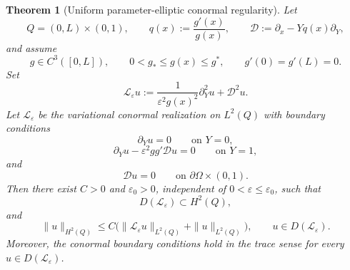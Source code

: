 \documentclass[11pt]{article}
\newtheorem{theorem}{Theorem}[section]
\theoremstyle{definition}
\theoremstyle{remark}
\numberwithin{equation}{section}
\begin{document}
\begin{theorem}[Uniform parameter-elliptic conormal regularity]
\label{thm:uniform-local-conormal-regularity}
Let
\[
Q=(0,L)\times(0,1),\qquad
q(x):=\frac{g'(x)}{g(x)},\qquad
\mathcal D:=\partial_x-Yq(x)\partial_Y,
\]
and assume
\[
g\in C^3([0,L]),\qquad
0<g_*\le g(x)\le g^*,
\qquad
g'(0)=g'(L)=0.
\]
Set
\[
\mathscr L_\varepsilon u
:=
\frac1{\varepsilon^2g(x)^2}\partial_Y^2u+\mathcal D^2u .
\]
Let \(\mathscr L_\varepsilon\) be the variational conormal realization on
\(L^2(Q)\) with boundary conditions
\[
\partial_Yu=0
\qquad\text{on }Y=0,
\]
\[
\partial_Yu-\varepsilon^2gg'\mathcal D u=0
\qquad\text{on }Y=1,
\]
and
\[
\mathcal D u=0
\qquad\text{on }\partial\Omega\times(0,1).
\]
Then there exist \(C>0\) and \(\varepsilon_0>0\), independent of
\(0<\varepsilon\le\varepsilon_0\), such that
\[
D(\mathscr L_\varepsilon)\subset H^2(Q),
\]
and
\[
\|u\|_{H^2(Q)}
\le
C\bigl(
\|\mathscr L_\varepsilon u\|_{L^2(Q)}
+
\|u\|_{L^2(Q)}
\bigr),
\qquad
u\in D(\mathscr L_\varepsilon).
\]
Moreover, the conormal boundary conditions hold in the trace sense for every
\(u\in D(\mathscr L_\varepsilon)\).
\end{theorem}
\end{document}
